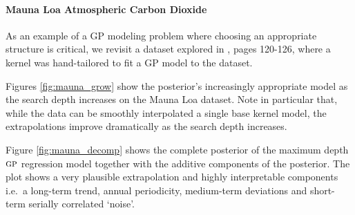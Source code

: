 \documentclass[twoside]{article}
\begin{document}
\paragraph{Mauna Loa Atmospheric Carbon Dioxide}

As an example of a GP modeling problem where choosing an appropriate structure is critical, we revisit a dataset explored in \cite{rasmussen38gaussian}, pages 120-126, where a kernel was hand-tailored to fit a GP model to the dataset.

Figures \ref{fig:mauna_grow} show the posterior's increasingly appropriate model as the search depth increases on the Mauna Loa dataset.
Note in particular that, while the data can be smoothly interpolated a single base kernel model, the extrapolations improve dramatically as the search depth increases.

Figure \ref{fig:mauna_decomp} shows the complete posterior of the maximum depth ${\textsc{gp}}$ regression model together with the additive components of the posterior.
The plot shows a very plausible extrapolation and highly interpretable components i.e.~a long-term trend, annual periodicity, medium-term deviations and short-term serially correlated `noise'.
\end{document}
